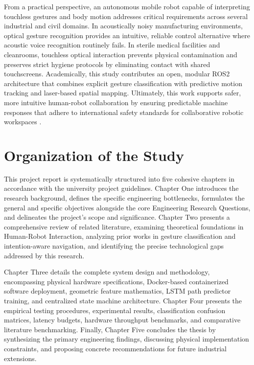 From a practical perspective, an autonomous mobile robot capable of interpreting touchless gestures and body motion addresses critical requirements across several industrial and civil domains. In acoustically noisy manufacturing environments, optical gesture recognition provides an intuitive, reliable control alternative where acoustic voice recognition routinely fails. In sterile medical facilities and cleanrooms, touchless optical interaction prevents physical contamination and preserves strict hygiene protocols by eliminating contact with shared touchscreens. Academically, this study contributes an open, modular ROS2 architecture that combines explicit gesture classification with predictive motion tracking and laser-based spatial mapping. Ultimately, this work supports safer, more intuitive human-robot collaboration by ensuring predictable machine responses that adhere to international safety standards for collaborative robotic workspaces \cite{iso150662016}.

\section{Organization of the Study}
This project report is systematically structured into five cohesive chapters in accordance with the university project guidelines. Chapter One introduces the research background, defines the specific engineering bottlenecks, formulates the general and specific objectives alongside the core Engineering Research Questions, and delineates the project's scope and significance. Chapter Two presents a comprehensive review of related literature, examining theoretical foundations in Human-Robot Interaction, analyzing prior works in gesture classification and intention-aware navigation, and identifying the precise technological gaps addressed by this research. 

Chapter Three details the complete system design and methodology, encompassing physical hardware specifications, Docker-based containerized software deployment, geometric feature mathematics, LSTM path predictor training, and centralized state machine architecture. Chapter Four presents the empirical testing procedures, experimental results, classification confusion matrices, latency budgets, hardware throughput benchmarks, and comparative literature benchmarking. Finally, Chapter Five concludes the thesis by synthesizing the primary engineering findings, discussing physical implementation constraints, and proposing concrete recommendations for future industrial extensions.
